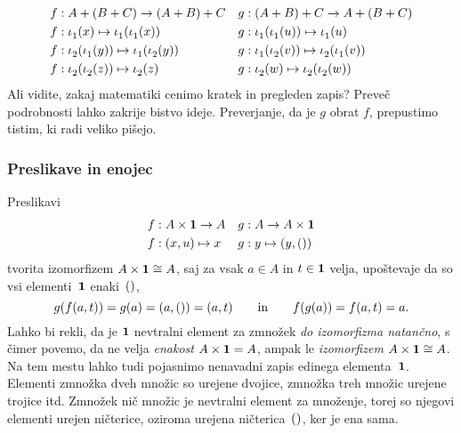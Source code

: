 %
\begin{align*}
  f &:  A + (B + C) \to (A + B) + C &
  g &: (A + B) + C \to A + (B + C) \\
  f &: \inl(x)             \mapsto \inl(\inl(x)) &
  g &: \inl(\inl(u)) \mapsto \inl(u)\\
  f &: \inr(\inl(y)) \mapsto \inl(\inr(y)) &
  g &: \inl(\inr(v)) \mapsto \inr(\inl(v))  \\
  f &: \inr(\inr(z)) \mapsto \inr(z) &
  g &: \inr(w)              \mapsto \inr(\inr(w))
\end{align*}
%
Ali vidite, zakaj matematiki cenimo kratek in pregleden zapis? Preveč podrobnosti lahko
zakrije bistvo ideje. Preverjanje, da je $g$ obrat $f$, prepustimo tistim, ki radi veliko
pišejo.

\subsubsection{Preslikave in enojec}
\label{sec:preslikave-enojec}

Preslikavi
%
\begin{align*}
  f &: A \times \mathtt{\mathbf{1}} \to A &
  g &: A \to A \times \mathtt{\mathbf{1}} \\
  f &: (x, u) \mapsto x &
  g &: y \mapsto (y, \mathord{()})
\end{align*}
%
tvorita izomorfizem $A \times \mathtt{\mathbf{1}} \cong A$, saj za vsak $a \in A$ in $t \in \mathtt{\mathbf{1}}$ velja,
upoštevaje da so vsi elementi~$\mathtt{\mathbf{1}}$ enaki~$\mathord{()}$,
%
\begin{equation*}
  g(f(a, t)) = g(a) = (a, \mathord{()}) = (a, t)
  \qquad\text{in}\qquad
  f(g(a)) = f(a, t) = a.
\end{equation*}
%
Lahko bi rekli, da je $\mathtt{\mathbf{1}}$ nevtralni element za zmnožek \emph{do izomorfizma natančno},
s čimer povemo, da ne velja \emph{enakost} $A \times \mathtt{\mathbf{1}} = A$, ampak le
\emph{izomorfizem} $A \times \mathtt{\mathbf{1}} \cong A$. Na tem mestu lahko tudi pojasnimo nenavadni
zapis edinega elementa~$\mathtt{\mathbf{1}}$. Elementi zmnožka dveh množic so urejene dvojice, zmnožka
treh množic urejene trojice itd. Zmnožek nič množic je nevtralni element za množenje,
torej so njegovi elementi urejen ničterice, oziroma urejena ničterica~$\mathord{()}$, ker je ena
sama.


